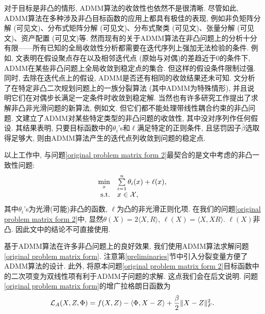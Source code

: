\par 对于目标是非凸的情形, ADMM算法的收敛性也依然不是很清晰. 尽管如此, ADMM算法在多种涉及非凸目标函数的应用上都具有极佳的表现, 例如非负矩阵分解 (可见文\cite{Zhang2010An,Sun2014Alternating})、分布式矩阵分解 (可见文\cite{Zhang2014Asynchronous})、分布式聚类 (可见文\cite{Forero2011Distributed})、张量分解 (可见文\cite{Liavas2013Parallel})、资产配置 (可见文\cite{Wen2013Asset})等. 然而现有的关于ADMM算法在非凸问题上的分析十分有限——所有已知的全局收敛性分析都需要在迭代序列上强加无法检验的条件. 例如, 文\cite{Jiang2013Alternating,Shen2014Augmented,Xu2011An,Wen2013Asset}表明在假设聚点存在以及相邻迭代点 (原始与对偶)的差趋近于0的条件下, ADMM在某些非凸问题上全局收敛到稳定点的集合. 但这样的假设条件限制过强. 同时, 去除在迭代点上的假设, ADMM是否还有相同的收敛结果还未可知. 文\cite{Zhang2010Convergence}分析了在特定非凸二次规划问题上的一族分裂算法 (其中ADMM为特殊情形), 并且说明它们在对偶步长满足一定条件时收敛到稳定解. 当然也有许多研究工作提出了求解非凸非光滑问题的新算法, 例如文\cite{Razaviyayn2013A,Ghadimi2015Accelerated,Ghadimi2014Mini,Scutari2014Decomposition,Bolte2014Proximal}. 但它们都不能处理带线性耦合约束的非凸问题. 文\cite{Hong2016COnvergence}建立了ADMM对某些特定类型的非凸问题的收敛性, 其中没对序列作任何假设. 其结果表明, 只要目标函数中的$\theta_i$'s和$\ell$满足特定的正则条件, 且惩罚因子$\bar\beta$选取得足够大, 则由ADMM算法产生的迭代点列收敛到问题的稳定点. 
\par 以上工作中, 与问题\eqref{original problem matrix form 2}最契合的是文\cite{Hong2016COnvergence}中考虑的非凸一致性问题:
$$\begin{array}{rl}
	\min\limits_x & \sum\limits_{i=1}^n\theta_i(x)+\ell(x),\\
	\mathrm{s.t.} & x\in \mathcal{X},
\end{array}$$
其中$\theta_i$'s为光滑(可能)非凸的函数, $\ell$为凸的非光滑正则化项. 在我们的问题\eqref{original problem matrix form 2}中, 显然$\theta(X)=2\langle X,R\rangle$, $\ell(X)=\langle X,XR\rangle$. $\ell(X)$非凸. 因此文\cite{Hong2016COnvergence}中的结论不可直接使用.
\par 基于ADMM算法在许多非凸问题上的良好效果, 我们使用ADMM算法求解问题\eqref{original problem matrix form}. 注意第\ref{preliminaries}节中引入分裂变量方便了ADMM算法的设计. 此外, 将原本问题\eqref{original problem matrix form 2}目标函数中的二次项变为双线性项有利于ADMM子问题的求解. 这点我们会在后文说明. 问题\eqref{original problem matrix form}的增广拉格朗日函数为
\begin{equation}
	\mathcal{L}_A(X,Z,\Phi)=f(X,Z)-\langle\Phi,X-Z\rangle+\frac{\beta}{2}\Vert X-Z\Vert_F^2.
	\label{alf}
\end{equation}

